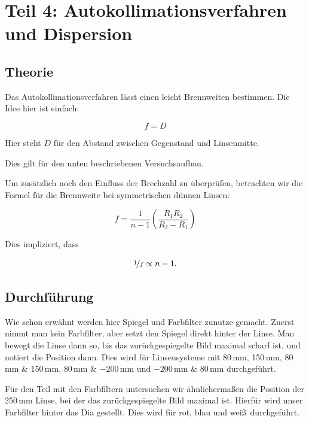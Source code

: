 \documentclass[11pt,a4paper]{article}
\begin{document}
\section{Teil 4: Autokollimationsverfahren und Dispersion}

\subsection{Theorie}

Das Autokollimationsverfahren l\"asst einen leicht Brennweiten bestimmen. Die Idee hier ist einfach:

\begin{equation}
f=D\label{eq:7}
\end{equation}

Hier steht $D$ f\"ur den Abstand zwischen Gegenstand und Linsenmitte.

Dies gilt f\"ur den unten beschriebenen Versuchsaufbau.

Um zus\"atzlich noch den Einfluss der Brechzahl zu \"uberpr\"ufen, betrachten wir die Formel f\"ur die Brennweite bei symmetrischen d\"unnen Linsen:

\begin{equation}
f=\frac{1}{n-1}\left(\frac{R_1R_2}{R_2-R_1}\right)\label{eq:8}
\end{equation}

Dies impliziert, dass

\begin{equation}
\nicefrac{1}{f}\propto n-1.\label{eq:9}
\end{equation}

\subsection{Durchführung}

Wie schon erw\"ahnt werden hier Spiegel und Farbfilter zunutze gemacht. Zuerst nimmt man kein Farbfilter, aber setzt den Spiegel direkt hinter der Linse. Man bewegt die Linse dann so, bis das zur\"uckgespiegelte Bild maximal scharf ist, und notiert die Position dann. Dies wird f\"ur Linsensysteme mit 80\,mm, 150\,mm, 80\,mm \& 150\,mm, 80\,mm \& $-200$\,mm und $-200$\,mm \& 80\,mm durchgef\"uhrt.

F\"ur den Teil mit den Farbfiltern untersuchen wir \"ahnlicherma\ss en die Position der 250\,mm Linse, bei der das zur\"uckgespiegelte Bild maximal ist. Hierf\"ur wird unser Farbfilter hinter das Dia gestellt. Dies wird f\"ur rot, blau und wei\ss\ durchgef\"uhrt.
\end{document}
